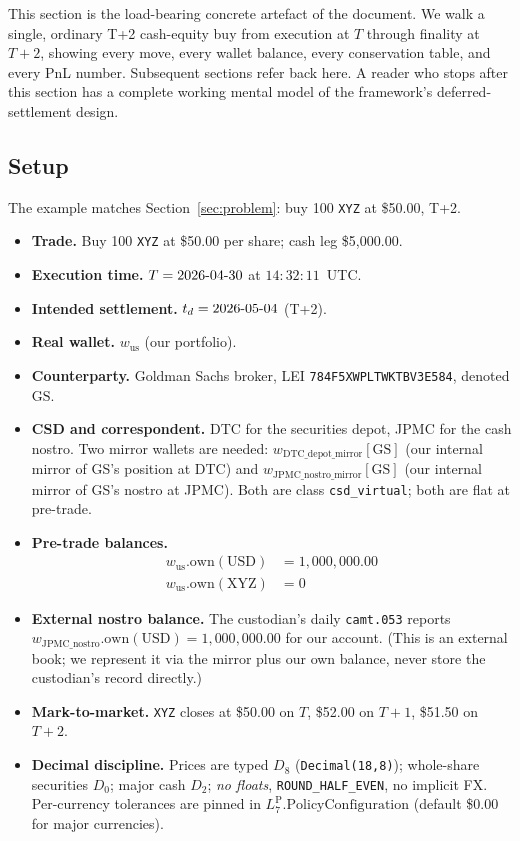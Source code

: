\documentclass[11pt,a4paper]{article}
\begin{document}
This section is the load-bearing concrete artefact of the document. We walk a single, ordinary T+2 cash-equity buy from execution at $T$ through finality at $T+2$, showing every move, every wallet balance, every conservation table, and every PnL number. Subsequent sections refer back here. A reader who stops after this section has a complete working mental model of the framework's deferred-settlement design.

\subsection{Setup}
\label{sec:buy-setup}

The example matches Section~\ref{sec:problem}: buy 100 \texttt{XYZ} at \$50.00, T+2.

\begin{itemize}[nosep]
\item \textbf{Trade.} Buy 100 \texttt{XYZ} at \$50.00 per share; cash leg \$5{,}000.00.
\item \textbf{Execution time.} $T = 2026\textnormal{-}04\textnormal{-}30$ at $14{:}32{:}11$~UTC.
\item \textbf{Intended settlement.} $t_d = 2026\textnormal{-}05\textnormal{-}04$ (T+2).
\item \textbf{Real wallet.} $w_{\mathrm{us}}$ (our portfolio).
\item \textbf{Counterparty.} Goldman Sachs broker, LEI \texttt{784F5XWPLTWKTBV3E584}, denoted $\mathrm{GS}$.
\item \textbf{CSD and correspondent.} DTC for the securities depot, JPMC for the cash nostro. Two mirror wallets are needed: $w_{\mathrm{DTC\_depot\_mirror}}[\mathrm{GS}]$ (our internal mirror of GS's position at DTC) and $w_{\mathrm{JPMC\_nostro\_mirror}}[\mathrm{GS}]$ (our internal mirror of GS's nostro at JPMC). Both are class \texttt{csd\_virtual}; both are flat at pre-trade.
\item \textbf{Pre-trade balances.}
\begin{align*}
w_{\mathrm{us}}.\mathrm{own}(\mathrm{USD}) &= 1{,}000{,}000.00 \\
w_{\mathrm{us}}.\mathrm{own}(\mathrm{XYZ}) &= 0
\end{align*}
\item \textbf{External nostro balance.} The custodian's daily \texttt{camt.053} reports $w_{\mathrm{JPMC\_nostro}}.\mathrm{own}(\mathrm{USD}) = 1{,}000{,}000.00$ for our account. (This is an external book; we represent it via the mirror plus our own balance, never store the custodian's record directly.)
\item \textbf{Mark-to-market.} \texttt{XYZ} closes at \$50.00 on $T$, \$52.00 on $T+1$, \$51.50 on $T+2$.
\item \textbf{Decimal discipline.} Prices are typed $D_8$ (\texttt{Decimal(18,8)}); whole-share securities $D_0$; major cash $D_2$; \emph{no floats}, \texttt{ROUND\_HALF\_EVEN}, no implicit FX. Per-currency tolerances are pinned in $L_7^{\mathrm{P}}.\mathrm{PolicyConfiguration}$ (default \$0.00 for major currencies).
\end{itemize}
\end{document}
